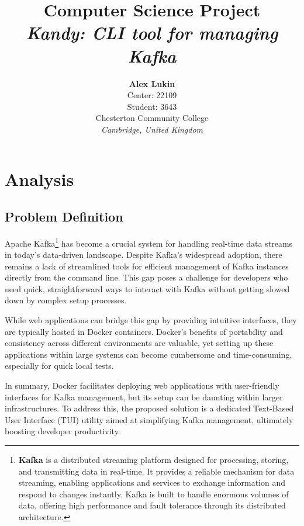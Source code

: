 \documentclass[10pt , a4paper]{report}
\begin{document}
\title{Computer Science Project\\
        \textit{Kandy: CLI tool for managing Kafka}}

\author{\textbf{Alex Lukin}\\
Center: 22109\\
Student: 3643\\
Chesterton Community College\\
\textit{Cambridge, United Kingdom}\\}


\maketitle

\newpage
\tableofcontents
\newpage

\chapter{Analysis}
\section{Problem Definition}

Apache Kafka\footnote{\textbf{Kafka} is a distributed streaming platform designed for processing, storing, and transmitting data in real-time. It provides a reliable mechanism for data streaming, enabling applications and services to exchange information and respond to changes instantly. Kafka is built to handle enormous volumes of data, offering high performance and fault tolerance through its distributed architecture.} has become a crucial system for handling real-time data streams in today’s data-driven landscape. Despite Kafka’s widespread adoption, there remains a lack of streamlined tools for efficient management of Kafka instances directly from the command line. This gap poses a challenge for developers who need quick, straightforward ways to interact with Kafka without getting slowed down by complex setup processes.

While web applications can bridge this gap by providing intuitive interfaces, they are typically hosted in Docker containers. Docker’s benefits of portability and consistency across different environments are valuable, yet setting up these applications within large systems can become cumbersome and time-consuming, especially for quick local tests.

In summary, Docker facilitates deploying web applications with user-friendly interfaces for Kafka management, but its setup can be daunting within larger infrastructures. To address this, the proposed solution is a dedicated Text-Based User Interface (TUI) utility aimed at simplifying Kafka management, ultimately boosting developer productivity.
\end{document}
